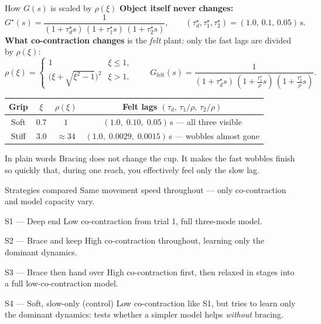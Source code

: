 \documentclass[aspectratio=169, 11pt]{beamer}
\begin{document}
\begin{frame}{How $G(s)$ is scaled by $\rho(\xi)$}
\small
\textbf{Object itself never changes:}
\[
G^\star(s)=\frac{1}{(1+\tau_d^\star s)\,(1+\tau_1^\star s)\,(1+\tau_2^\star s)},
\qquad (\tau_d^\star,\tau_1^\star,\tau_2^\star)=(1.0,\,0.1,\,0.05)\,\mathrm{s}.
\]
\vspace{2pt}
\textbf{What co-contraction changes} is the \emph{felt} plant: only the fast lags are divided by $\rho(\xi)$:
\[
\rho(\xi)=\begin{cases}
1 & \xi\le 1,\\[2pt]
\bigl(\xi+\sqrt{\xi^{2}-1}\bigr)^{2} & \xi>1,
\end{cases}
\qquad
G_{\mathrm{felt}}(s)=\frac{1}{(1+\tau_d^\star s)\,(1+\tfrac{\tau_1^\star}{\rho}s)\,(1+\tfrac{\tau_2^\star}{\rho}s)}.
\]
\vspace{4pt}
\begin{center}
\begin{tabular}{@{}cccc@{}}
\toprule
Grip & $\xi$ & $\rho(\xi)$ & Felt lags $(\tau_d,\,\tau_1/\rho,\,\tau_2/\rho)$ \\
\midrule
Soft  & $0.7$ & $1$ & $(1.0,\;0.10,\;0.05)$\,s --- all three visible \\
Stiff & $3.0$ & $\approx 34$ & $(1.0,\;0.0029,\;0.0015)$\,s --- wobbles almost gone \\
\bottomrule
\end{tabular}
\end{center}
\vspace{6pt}
\begin{block}{In plain words}
Bracing does not change the cup. It makes the fast wobbles finish so quickly
that, during one reach, you effectively feel only the slow lag.
\end{block}
\end{frame}

\begin{frame}{Strategies compared}
Same movement speed throughout --- only co-contraction and model capacity vary.
\vspace{4pt}
\begin{block}{S1 --- Deep end}
Low co-contraction from trial 1, full three-mode model.
\end{block}
\begin{block}{S2 --- Brace and keep}
High co-contraction throughout, learning only the dominant dynamics.
\end{block}
\begin{block}{S3 --- Brace then hand over}
High co-contraction first, then relaxed in stages into a full
low-co-contraction model.
\end{block}
\begin{block}{S4 --- Soft, slow-only (control)}
Low co-contraction like S1, but tries to learn only the dominant
dynamics: tests whether a simpler model helps \emph{without} bracing.
\end{block}
\end{frame}
\end{document}
